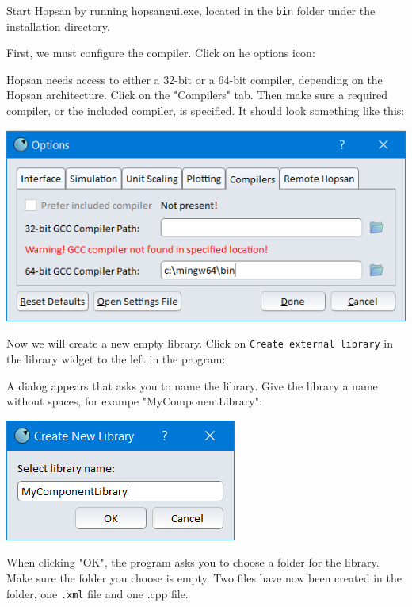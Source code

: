 \documentclass[a4paper,pdftex]{article}
\begin{document}
\begin{tutenumerate}
Start Hopsan by running hopsangui.exe, located in the \texttt{bin} folder under the installation directory.

First, we must configure the compiler. Click on he options icon:


Hopsan needs access to either a 32-bit or a 64-bit compiler, depending on the Hopsan architecture.
Click on the "Compilers" tab.
Then make sure a required compiler, or the included compiler, is specified. It should look something like this:

\includegraphics{gfx/writingcomponents/options.png}

Now we will create a new empty library. 
Click on \texttt{Create external library} in the library widget to the left in the program:


A dialog appears that asks you to name the library. Give the library a name without spaces, for exampe "MyComponentLibrary":

\includegraphics[scale=0.85]{gfx/writingcomponents/newlibrarydialog.png}

When clicking "OK", the program asks you to choose a folder for the library. Make sure the folder you choose is empty.
Two files have now been created in the folder, one \texttt{.xml} file and one .cpp file.


\end{tutenumerate}
\end{document}
